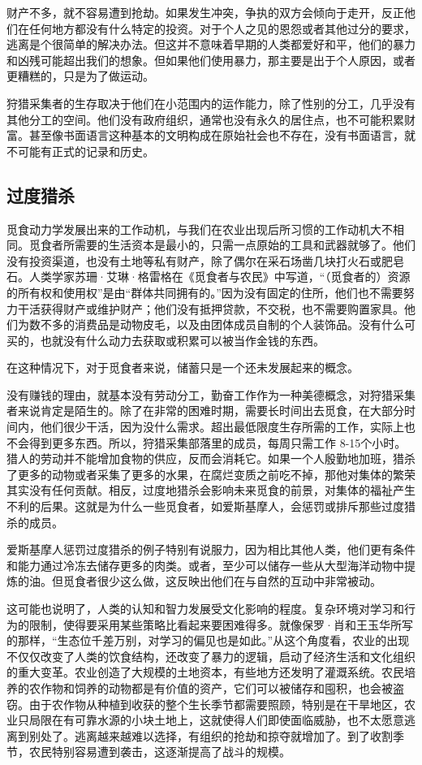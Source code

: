 财产不多，就不容易遭到抢劫。如果发生冲突，争执的双方会倾向于走开，反正他们在任何地方都没有什么特定的投资。对于个人之见的恩怨或者其他过分的要求，逃离是个很简单的解决办法。但这并不意味着早期的人类都爱好和平，他们的暴力和凶残可能超出我们的想象。但如果他们使用暴力，那主要是出于个人原因，或者更糟糕的，只是为了做运动。

狩猎采集者的生存取决于他们在小范围内的运作能力，除了性别的分工，几乎没有其他分工的空间。他们没有政府组织，通常也没有永久的居住点，也不可能积累财富。甚至像书面语言这种基本的文明构成在原始社会也不存在，没有书面语言，就不可能有正式的记录和历史。

\subsection{过度猎杀}
觅食动力学发展出来的工作动机，与我们在农业出现后所习惯的工作动机大不相同。觅食者所需要的生活资本是最小的，只需一点原始的工具和武器就够了。他们没有投资渠道，也没有土地等私有财产，除了偶尔在采石场凿几块打火石或肥皂石。人类学家苏珊·艾琳·格雷格在《觅食者与农民》中写道，“（觅食者的）资源的所有权和使用权”是由“群体共同拥有的。”因为没有固定的住所，他们也不需要努力干活获得财产或维护财产；他们没有抵押贷款，不交税，也不需要购置家具。他们为数不多的消费品是动物皮毛，以及由团体成员自制的个人装饰品。没有什么可买的，也就没有什么动力去获取或积累可以被当作金钱的东西。

在这种情况下，对于觅食者来说，储蓄只是一个还未发展起来的概念。

没有赚钱的理由，就基本没有劳动分工，勤奋工作作为一种美德概念，对狩猎采集者来说肯定是陌生的。除了在非常的困难时期，需要长时间出去觅食，在大部分时间内，他们很少干活，因为没什么需求。超出最低限度生存所需的工作，实际上也不会得到更多东西。所以，狩猎采集部落里的成员，每周只需工作 8-15个小时。猎人的劳动并不能增加食物的供应，反而会消耗它。如果一个人殷勤地加班，猎杀了更多的动物或者采集了更多的水果，在腐烂变质之前吃不掉，那他对集体的繁荣其实没有任何贡献。相反，过度地猎杀会影响未来觅食的前景，对集体的福祉产生不利的后果。这就是为什么一些觅食者，如爱斯基摩人，会惩罚或排斥那些过度猎杀的成员。

爱斯基摩人惩罚过度猎杀的例子特别有说服力，因为相比其他人类，他们更有条件和能力通过冷冻去储存更多的肉类。或者，至少可以储存一些从大型海洋动物中提炼的油。但觅食者很少这么做，这反映出他们在与自然的互动中非常被动。

这可能也说明了，人类的认知和智力发展受文化影响的程度。复杂环境对学习和行为的限制，使得要采用某些策略比看起来要困难得多。就像保罗·肖和王玉华所写的那样，“生态位千差万别，对学习的偏见也是如此。”从这个角度看，农业的出现不仅仅改变了人类的饮食结构，还改变了暴力的逻辑，启动了经济生活和文化组织的重大变革。农业创造了大规模的土地资本，有些地方还发明了灌溉系统。农民培养的农作物和饲养的动物都是有价值的资产，它们可以被储存和囤积，也会被盗窃。由于农作物从种植到收获的整个生长季节都需要照顾，特别是在干旱地区，农业只局限在有可靠水源的小块土地上，这就使得人们即使面临威胁，也不太愿意逃离到别处了。逃离越来越难以选择，有组织的抢劫和掠夺就增加了。到了收割季节，农民特别容易遭到袭击，这逐渐提高了战斗的规模。

